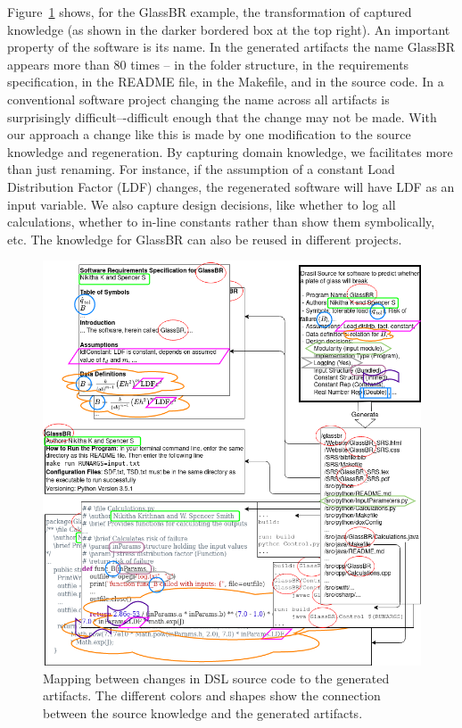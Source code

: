 \documentclass[sigconf,review]{acmart}
\begin{document}
Figure~\ref{Fig_DrasilAndChange} shows, for the GlassBR example, the
transformation of captured knowledge (as shown in the darker bordered box at the
top right). An important property of the software is its name.  In the generated
artifacts the name GlassBR appears more than 80 times – in the folder structure,
in the requirements specification, in the README file, in the Makefile, and in
the source code. In a conventional software project changing the name across all
artifacts is surprisingly difficult–-difficult enough that the change may not be
made. With our approach a change like this is made by one modification to the source
knowledge and regeneration. By capturing domain knowledge, we facilitates
more than just renaming. For instance, if the assumption of a constant Load
Distribution Factor (LDF) changes, the regenerated software will have LDF as an
input variable. We also capture design decisions, like whether to log all
calculations, whether to in-line constants rather than show them symbolically,
etc. The knowledge for GlassBR can also be reused in different projects.

\begin{figure}[h]
  \centering
  \includegraphics[width=\linewidth]{assets/DrasilSupportsChange-right-portrait-overlapped-ungrouped-v1.drawio.png}
  \caption{Mapping between changes in DSL source code to the generated
  artifacts. The different colors and shapes show the connection between the
  source knowledge and the generated artifacts.}
  \label{Fig_DrasilAndChange}
\end{figure}
\end{document}
